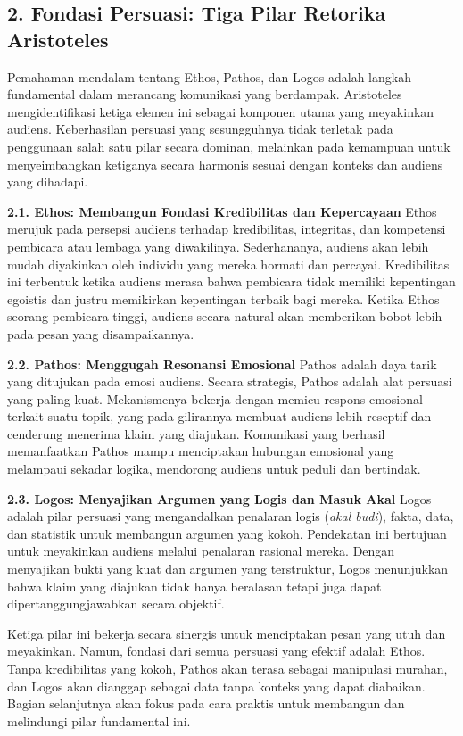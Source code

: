 \documentclass[
  letterpaper,
  DIV=11,
  numbers=noendperiod]{scrreprt}
\begin{document}
\subsection{\texorpdfstring{\textbf{2. Fondasi Persuasi: Tiga Pilar
Retorika
Aristoteles}}{2. Fondasi Persuasi: Tiga Pilar Retorika Aristoteles}}\label{fondasi-persuasi-tiga-pilar-retorika-aristoteles}

Pemahaman mendalam tentang Ethos, Pathos, dan Logos adalah langkah
fundamental dalam merancang komunikasi yang berdampak. Aristoteles
mengidentifikasi ketiga elemen ini sebagai komponen utama yang
meyakinkan audiens. Keberhasilan persuasi yang sesungguhnya tidak
terletak pada penggunaan salah satu pilar secara dominan, melainkan pada
kemampuan untuk menyeimbangkan ketiganya secara harmonis sesuai dengan
konteks dan audiens yang dihadapi.

\textbf{2.1. Ethos: Membangun Fondasi Kredibilitas dan Kepercayaan}
Ethos merujuk pada persepsi audiens terhadap kredibilitas, integritas,
dan kompetensi pembicara atau lembaga yang diwakilinya. Sederhananya,
audiens akan lebih mudah diyakinkan oleh individu yang mereka hormati
dan percayai. Kredibilitas ini terbentuk ketika audiens merasa bahwa
pembicara tidak memiliki kepentingan egoistis dan justru memikirkan
kepentingan terbaik bagi mereka. Ketika Ethos seorang pembicara tinggi,
audiens secara natural akan memberikan bobot lebih pada pesan yang
disampaikannya.

\textbf{2.2. Pathos: Menggugah Resonansi Emosional} Pathos adalah daya
tarik yang ditujukan pada emosi audiens. Secara strategis, Pathos adalah
alat persuasi yang paling kuat. Mekanismenya bekerja dengan memicu
respons emosional terkait suatu topik, yang pada gilirannya membuat
audiens lebih reseptif dan cenderung menerima klaim yang diajukan.
Komunikasi yang berhasil memanfaatkan Pathos mampu menciptakan hubungan
emosional yang melampaui sekadar logika, mendorong audiens untuk peduli
dan bertindak.

\textbf{2.3. Logos: Menyajikan Argumen yang Logis dan Masuk Akal} Logos
adalah pilar persuasi yang mengandalkan penalaran logis (\emph{akal
budi}), fakta, data, dan statistik untuk membangun argumen yang kokoh.
Pendekatan ini bertujuan untuk meyakinkan audiens melalui penalaran
rasional mereka. Dengan menyajikan bukti yang kuat dan argumen yang
terstruktur, Logos menunjukkan bahwa klaim yang diajukan tidak hanya
beralasan tetapi juga dapat dipertanggungjawabkan secara objektif.

Ketiga pilar ini bekerja secara sinergis untuk menciptakan pesan yang
utuh dan meyakinkan. Namun, fondasi dari semua persuasi yang efektif
adalah Ethos. Tanpa kredibilitas yang kokoh, Pathos akan terasa sebagai
manipulasi murahan, dan Logos akan dianggap sebagai data tanpa konteks
yang dapat diabaikan. Bagian selanjutnya akan fokus pada cara praktis
untuk membangun dan melindungi pilar fundamental ini.
\end{document}
